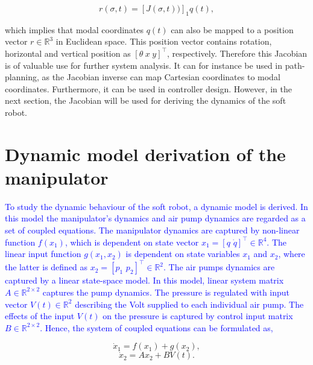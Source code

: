\begin{equation}
    r(\sigma,t) = [J(\sigma,t))]_1q(t),
\end{equation}

which implies that modal coordinates $q(t)$ can also be mapped to a position vector $r\in \mathbb{R}^3$ in Euclidean space. This position vector contains rotation, horizontal and vertical position as $[\theta \hspace{3pt} x \hspace{3pt} y]^\top$, respectively. Therefore this Jacobian is of valuable use for further system analysis. It can for instance be used in path-planning, as the Jacobian inverse can map Cartesian coordinates to modal coordinates. Furthermore, it can be used in controller design. However, in the next section, the Jacobian will be used for deriving the dynamics of the soft robot. 


\section{Dynamic model derivation of the manipulator}

\textcolor{blue}{To study the dynamic behaviour of the soft robot, a dynamic model is derived. In this model the manipulator's dynamics and air pump dynamics are regarded as a set of coupled equations. The manipulator dynamics are captured by non-linear function $f(x_1)$, which is dependent on state vector $x_1 = [ q \hspace{4pt} \dot{q} ]^\top \in \mathbb{R}^4$. The linear input function $g(x_1,x_2)$ is dependent on state variables $x_1$ and $x_2$, where the latter is defined as $x_2 = [p_1 \hspace{4pt} p_2]^\top \in \mathbb{R}^2$. The air pumps dynamics are captured by a linear state-space model. In this model, linear system matrix $A \in \mathbb{R}^{2\times 2}$ captures the pump dynamics. The pressure is regulated with input vector $V(t) \in \mathbb{R}^2$ describing the Volt supplied to each individual air pump. The effects of the input $V(t)$ on the pressure is captured by control input matrix $B \in \mathbb{R}^{2\times2}$. Hence, the system of coupled equations can be formulated as,}




\begin{equation}
    \dot{x}_1  = f(x_1) + g(x_2), 
       \label{eq2:nonlineq1}
    \end{equation}
    \begin{equation}
    \dot{x}_2 = Ax_2 + BV(t). 
    \label{eq2:nonlineq2}
\end{equation}

